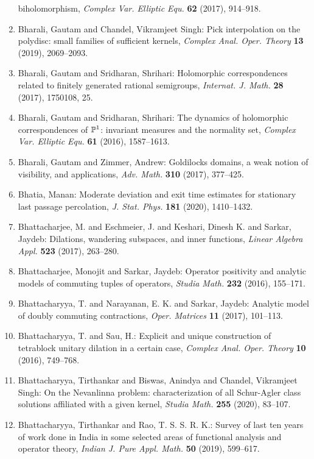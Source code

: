 \begin{enumerate}
biholomorphism, \emph{Complex Var. Elliptic Equ.} {\bf 62} (2017), 914--918.
\item Bharali, Gautam and Chandel, Vikramjeet Singh: Pick interpolation on the polydisc: small families of
sufficient kernels, \emph{Complex Anal. Oper. Theory} {\bf 13} (2019), 2069--2093.
\item Bharali, Gautam and Sridharan, Shrihari: Holomorphic correspondences related to finitely generated
rational semigroups, \emph{Internat. J. Math.} {\bf 28} (2017), 1750108, 25.
\item Bharali, Gautam and Sridharan, Shrihari: The dynamics of holomorphic correspondences of {$\Bbb P^1$}:
invariant measures and the normality set, \emph{Complex Var. Elliptic Equ.} {\bf 61} (2016), 1587--1613.
\item Bharali, Gautam and Zimmer, Andrew: Goldilocks domains, a weak notion of visibility, and
applications, \emph{Adv. Math.} {\bf 310} (2017), 377--425.
\item Bhatia, Manan: Moderate deviation and exit time estimates for stationary last
passage percolation, \emph{J. Stat. Phys.} {\bf 181} (2020), 1410--1432.
\item Bhattacharjee, M. and Eschmeier, J. and Keshari, Dinesh K. and
Sarkar, Jaydeb: Dilations, wandering subspaces, and inner functions, \emph{Linear Algebra Appl.} {\bf 523} (2017), 263--280.
\item Bhattacharjee, Monojit and Sarkar, Jaydeb: Operator positivity and analytic models of commuting tuples of
operators, \emph{Studia Math.} {\bf 232} (2016), 155--171.
\item Bhattacharyya, T. and Narayanan, E. K. and Sarkar, Jaydeb: Analytic model of doubly commuting contractions, \emph{Oper. Matrices} {\bf 11} (2017), 101--113.
\item Bhattacharyya, T. and Sau, H.: Explicit and unique construction of tetrablock unitary
dilation in a certain case, \emph{Complex Anal. Oper. Theory} {\bf 10} (2016), 749--768.
\item Bhattacharyya, Tirthankar and Biswas, Anindya and Chandel,
Vikramjeet Singh: On the {N}evanlinna problem: characterization of all
{S}chur-{A}gler class solutions affiliated with a given
kernel, \emph{Studia Math.} {\bf 255} (2020), 83--107.
\item Bhattacharyya, Tirthankar and Rao, T. S. S. R. K.: Survey of last ten years of work done in {I}ndia in some
selected areas of functional analysis and operator theory, \emph{Indian J. Pure Appl. Math.} {\bf 50} (2019), 599--617.

\end{enumerate}
